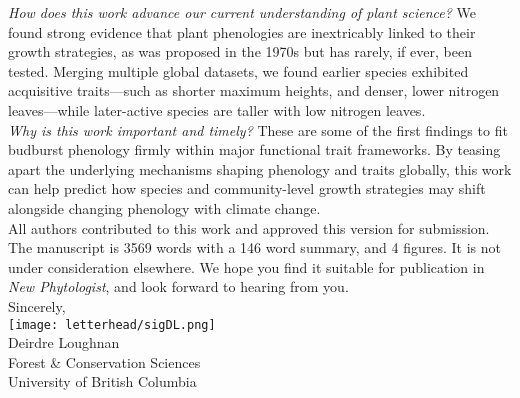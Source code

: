 \documentclass[11pt,a4paper]{article}
\begin{document}
\emph{How does this work advance our current understanding of plant science?} We found strong evidence that plant phenologies are inextricably linked to their growth strategies, as was proposed in the 1970s but has rarely, if ever, been tested. Merging multiple global datasets, we found earlier species exhibited acquisitive traits---such as shorter maximum heights, and denser, lower nitrogen leaves---while later-active species are taller with low nitrogen leaves.
\vspace{1.5ex}\\
\emph{Why is this work important and timely?} These are some of the first findings to fit budburst phenology firmly within major functional trait frameworks. By teasing apart the underlying mechanisms shaping phenology and traits globally, this work can help predict how species and community-level growth strategies may shift alongside changing phenology with climate change. 
\vspace{1.5ex}\\
\noindent All authors contributed to this work and approved this version for submission. The manuscript is 3569 words with a 146 word summary, and 4 figures. It is not under consideration elsewhere. We hope you find it suitable for publication in \emph{New Phytologist}, and look forward to hearing from you. 
\vspace{1.5ex}\\
\noindent Sincerely, \\
\texttt{[image: letterhead/sigDL.png]} \\
\noindent Deirdre Loughnan\\
\noindent Forest \& Conservation Sciences\\
\noindent University of British Columbia

\newpage
\end{document}
